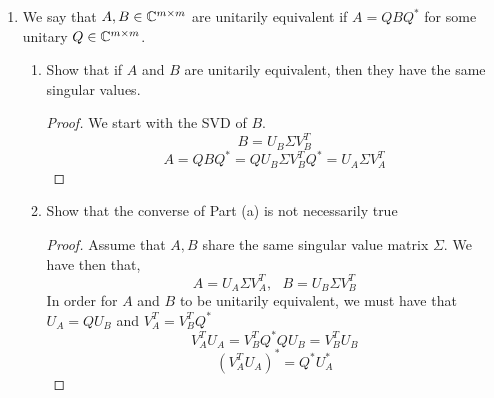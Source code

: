 \documentclass{article}
\begin{document}
\begin{enumerate}
    \item %
    We say that $A, B \in \mathbb{C}^{m\times m}$ are unitarily equivalent if $A = QBQ^*$ for some
unitary $Q \in \mathbb{C}^{m\times m}$.
    \begin{enumerate}
    \item 
    Show that if $A$ and $B$ are unitarily equivalent, then they have the
same singular values.
    \begin{proof}
        We start with the SVD of $B$. 
        \[
            B = U_B\Sigma V_B^T 
        \]
        \[
            A = QBQ^* = QU_B\Sigma V_B^TQ^* = U_A\Sigma V_A^T
        \]
    \end{proof}
    \item 
    Show that the converse of Part (a) is not necessarily true
    \begin{proof}
        Assume that $A, B$ share the same singular value matrix $\Sigma$. We have then that, 
        \[
            A = U_A\Sigma V_A^T, \text{ } B = U_B\Sigma V_B^T
        \] 
        In order for $A$ and $B$ to be unitarily equivalent, we must have that $U_A = QU_B$ and $V_A^T = V_B^TQ^*$
        \[
           V_A^TU_A = V_B^TQ^*QU_B = V_B^TU_B
        \]
        \[
            (V_A^TU_A)^* = Q^*U_A^*
        \]
    \end{proof}
    \end{enumerate}%
    


\end{enumerate}
\end{document}
